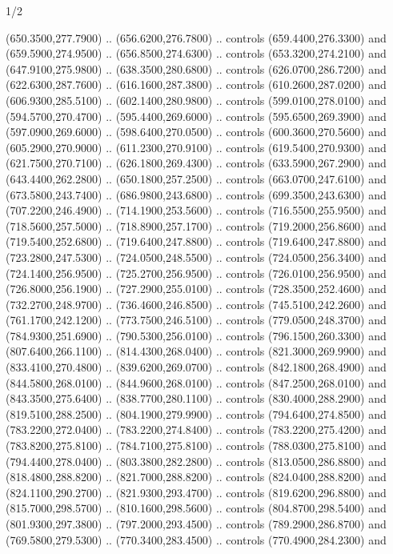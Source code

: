 \begin{flagdescription}{1/2}
\begin{scope}[xshift=0.5\flaglength,yshift=0.5\flagwidth,scale=\flagwidth/205]
\begin{scope}[y=-0.285pt, x=0.285pt,xshift=-205.4,yshift=101.3]
\begin{scope}[fill=red]
  (650.3500,277.7900) .. (656.6200,276.7800) .. controls (659.4400,276.3300) and
  (659.5900,274.9500) .. (656.8500,274.6300) .. controls (653.3200,274.2100) and
  (647.9100,275.9800) .. (638.3500,280.6800) .. controls (626.0700,286.7200) and
  (622.6300,287.7600) .. (616.1600,287.3800) .. controls (610.2600,287.0200) and
  (606.9300,285.5100) .. (602.1400,280.9800) .. controls (599.0100,278.0100) and
  (594.5700,270.4700) .. (595.4400,269.6000) .. controls (595.6500,269.3900) and
  (597.0900,269.6000) .. (598.6400,270.0500) .. controls (600.3600,270.5600) and
  (605.2900,270.9000) .. (611.2300,270.9100) .. controls (619.5400,270.9300) and
  (621.7500,270.7100) .. (626.1800,269.4300) .. controls (633.5900,267.2900) and
  (643.4400,262.2800) .. (650.1800,257.2500) .. controls (663.0700,247.6100) and
  (673.5800,243.7400) .. (686.9800,243.6800) .. controls (699.3500,243.6300) and
  (707.2200,246.4900) .. (714.1900,253.5600) .. controls (716.5500,255.9500) and
  (718.5600,257.5000) .. (718.8900,257.1700) .. controls (719.2000,256.8600) and
  (719.5400,252.6800) .. (719.6400,247.8800) .. controls (719.6400,247.8800) and
  (723.2800,247.5300) .. (724.0500,248.5500) .. controls (724.0500,256.3400) and
  (724.1400,256.9500) .. (725.2700,256.9500) .. controls (726.0100,256.9500) and
  (726.8000,256.1900) .. (727.2900,255.0100) .. controls (728.3500,252.4600) and
  (732.2700,248.9700) .. (736.4600,246.8500) .. controls (745.5100,242.2600) and
  (761.1700,242.1200) .. (773.7500,246.5100) .. controls (779.0500,248.3700) and
  (784.9300,251.6900) .. (790.5300,256.0100) .. controls (796.1500,260.3300) and
  (807.6400,266.1100) .. (814.4300,268.0400) .. controls (821.3000,269.9900) and
  (833.4100,270.4800) .. (839.6200,269.0700) .. controls (842.1800,268.4900) and
  (844.5800,268.0100) .. (844.9600,268.0100) .. controls (847.2500,268.0100) and
  (843.3500,275.6400) .. (838.7700,280.1100) .. controls (830.4000,288.2900) and
  (819.5100,288.2500) .. (804.1900,279.9900) .. controls (794.6400,274.8500) and
  (783.2200,272.0400) .. (783.2200,274.8400) .. controls (783.2200,275.4200) and
  (783.8200,275.8100) .. (784.7100,275.8100) .. controls (788.0300,275.8100) and
  (794.4400,278.0400) .. (803.3800,282.2800) .. controls (813.0500,286.8800) and
  (818.4800,288.8200) .. (821.7000,288.8200) .. controls (824.0400,288.8200) and
  (824.1100,290.2700) .. (821.9300,293.4700) .. controls (819.6200,296.8800) and
  (815.7000,298.5700) .. (810.1600,298.5600) .. controls (804.8700,298.5400) and
  (801.9300,297.3800) .. (797.2000,293.4500) .. controls (789.2900,286.8700) and
  (769.5800,279.5300) .. (770.3400,283.4500) .. controls (770.4900,284.2300) and

\end{scope}
\end{scope}
\end{scope}
\end{flagdescription}
